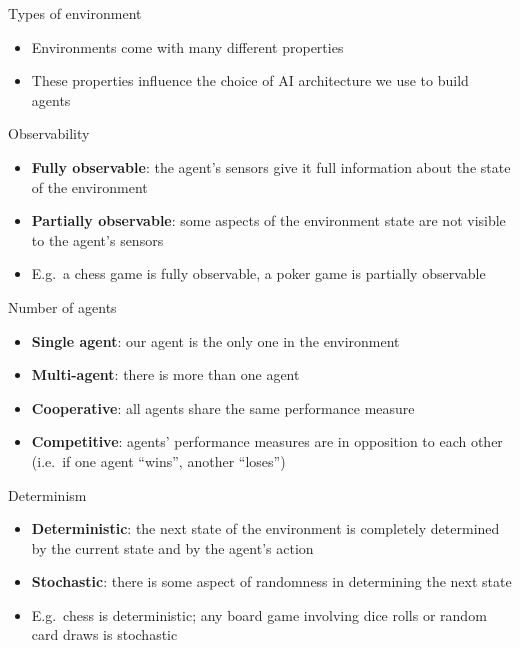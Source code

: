 \begin{frame}{Types of environment}
    \begin{itemize}
        \pause\item Environments come with many different properties
        \pause\item These properties influence the choice of AI architecture we use to build agents
    \end{itemize}
\end{frame}

\begin{frame}{Observability}
    \begin{itemize}
        \pause\item \textbf{Fully observable}: the agent's sensors give it full information about the state of the environment
        \pause\item \textbf{Partially observable}: some aspects of the environment state are not visible to the agent's sensors
        \pause\item E.g.\ a chess game is fully observable, a poker game is partially observable
    \end{itemize}
\end{frame}

\begin{frame}{Number of agents}
    \begin{itemize}
        \pause\item \textbf{Single agent}: our agent is the only one in the environment
        \pause\item \textbf{Multi-agent}: there is more than one agent
        \pause\item \textbf{Cooperative}: all agents share the same performance measure
        \pause\item \textbf{Competitive}: agents' performance measures are in opposition to each other
            (i.e.\ if one agent ``wins'', another ``loses'')
    \end{itemize}
\end{frame}

\begin{frame}{Determinism}
    \begin{itemize}
        \pause\item \textbf{Deterministic}: the next state of the environment is completely determined by the current state and by the agent's action
        \pause\item \textbf{Stochastic}: there is some aspect of randomness in determining the next state
        \pause\item E.g.\ chess is deterministic; any board game involving dice rolls or random card draws is stochastic
    \end{itemize}
\end{frame}

